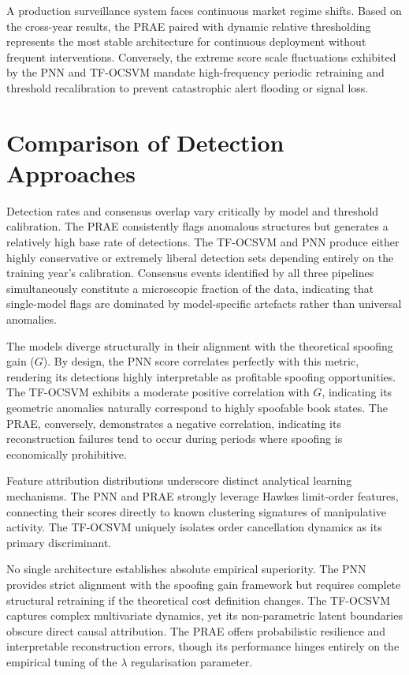 \documentclass[11pt]{report}
\begin{document}
A production surveillance system faces continuous market regime shifts. Based on the cross-year results, the PRAE paired with dynamic relative thresholding represents the most stable architecture for continuous deployment without frequent interventions. Conversely, the extreme score scale fluctuations exhibited by the PNN and TF-OCSVM mandate high-frequency periodic retraining and threshold recalibration to prevent catastrophic alert flooding or signal loss.


\section{Comparison of Detection Approaches}\label{sec:discussion:comparison}

Detection rates and consensus overlap vary critically by model and threshold calibration. The PRAE consistently flags anomalous structures but generates a relatively high base rate of detections. The TF-OCSVM and PNN produce either highly conservative or extremely liberal detection sets depending entirely on the training year's calibration. Consensus events identified by all three pipelines simultaneously constitute a microscopic fraction of the data, indicating that single-model flags are dominated by model-specific artefacts rather than universal anomalies.

The models diverge structurally in their alignment with the theoretical spoofing gain ($G$). By design, the PNN score correlates perfectly with this metric, rendering its detections highly interpretable as profitable spoofing opportunities. The TF-OCSVM exhibits a moderate positive correlation with $G$, indicating its geometric anomalies naturally correspond to highly spoofable book states. The PRAE, conversely, demonstrates a negative correlation, indicating its reconstruction failures tend to occur during periods where spoofing is economically prohibitive.

Feature attribution distributions underscore distinct analytical learning mechanisms. The PNN and PRAE strongly leverage Hawkes limit-order features, connecting their scores directly to known clustering signatures of manipulative activity. The TF-OCSVM uniquely isolates order cancellation dynamics as its primary discriminant. 

No single architecture establishes absolute empirical superiority. The PNN provides strict alignment with the spoofing gain framework but requires complete structural retraining if the theoretical cost definition changes. The TF-OCSVM captures complex multivariate dynamics, yet its non-parametric latent boundaries obscure direct causal attribution. The PRAE offers probabilistic resilience and interpretable reconstruction errors, though its performance hinges entirely on the empirical tuning of the $\lambda$ regularisation parameter.
\end{document}
